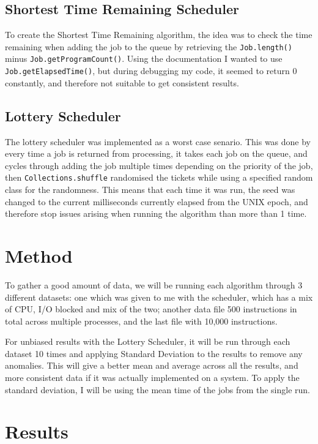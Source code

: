 \documentclass{acm_proc_article-sp}
\begin{document}
\subsection{Shortest Time Remaining Scheduler}

To create the Shortest Time Remaining algorithm, the idea was to check the time remaining when adding the job to the queue by retrieving the \texttt{Job.length()} minus \texttt{Job.get\-ProgramCount()}. Using the documentation I wanted to use \texttt{Job.getElapsedTime()}, but during debugging my code, it seemed to return 0 constantly, and therefore not suitable to get consistent results.

\subsection{Lottery Scheduler}

The lottery scheduler was implemented as a worst case senario. This was done by every time a job is returned from processing, it takes each job on the queue, and cycles through adding the job multiple times depending on the priority of the job, then \texttt{Collections.shuffle} randomised the tickets while using a specified random class for the randomness. This means that each time it was run, the seed was changed to the current milliseconds currently elapsed from the UNIX epoch, and therefore stop issues arising when running the algorithm than more than 1 time.

\section{Method}

To gather a good amount of data, we will be running each algorithm through 3 different datasets: one which was given to me with the scheduler, which has a mix of CPU, I/O blocked and mix of the two; another data file 500 instructions in total across multiple processes, and the last file with 10,000 instructions. 

For unbiased results with the Lottery Scheduler, it will be run through each dataset 10 times and applying Standard Deviation to the results to remove any anomalies. This will give a better mean and average across all the results, and more consistent data if it was actually implemented on a system. To apply the standard deviation, I will be using the mean time of the jobs from the single run. 

\section{Results}
\end{document}
